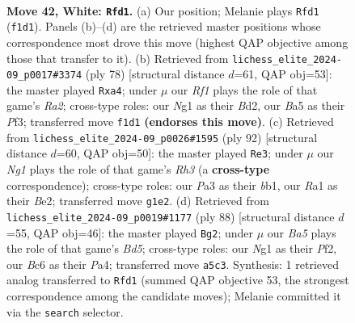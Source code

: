 \documentclass[11pt]{article}
\begin{document}
\clearpage

\begin{figure}[p]\centering
\begin{subfigure}{0.46\textwidth}\centering
\resizebox{\linewidth}{!}{%
\newchessgame
\chessboard[
  setfen={6r1/r7/p1Bnbk2/B5p1/5pP1/PP6/1K5P/R4RN1 w - - 1 42},
  showmover=false,
  pgfstyle=straightmove, color=movearrow, markmove={f1-d1}
]}
\caption{}
\end{subfigure}\hfill
\begin{subfigure}{0.46\textwidth}\centering
\resizebox{\linewidth}{!}{%
\newchessgame
\chessboard[
  setfen={r1r5/4kp2/2P3p1/4p1P1/p1P5/5PK1/R2B4/R7 w - - 1 40},
  showmover=false,
  pgfstyle=straightmove, color=movearrow, markmove={a2-a4}
]}
\caption{}
\end{subfigure}
\\[4pt]
\begin{subfigure}{0.46\textwidth}\centering
\resizebox{\linewidth}{!}{%
\newchessgame
\chessboard[
  setfen={1r4r1/8/2pkp2R/p2p4/3P2P1/PP5R/3KB3/1b6 w - - 9 47},
  showmover=false,
  pgfstyle=straightmove, color=movearrow, markmove={h3-e3}
]}
\caption{}
\end{subfigure}\hfill
\begin{subfigure}{0.46\textwidth}\centering
\resizebox{\linewidth}{!}{%
\newchessgame
\chessboard[
  setfen={2r5/2p1r3/1p1n1k2/1P1B2p1/P2P4/6P1/2R2P2/2R3K1 w - - 1 45},
  showmover=false,
  pgfstyle=straightmove, color=movearrow, markmove={d5-g2}
]}
\caption{}
\end{subfigure}
\caption{\textbf{Move 42, White: \texttt{Rfd1}.} (a) Our position; Melanie plays \texttt{Rfd1} (\texttt{f1d1}). Panels (b)--(d) are the retrieved master positions whose correspondence most drove this move (highest QAP objective among those that transfer to it). (b) Retrieved from \texttt{lichess\_elite\_2024-09\_p0017\#3374} (ply 78) [structural distance $d$=61, QAP obj=53]: the master played \texttt{Rxa4}; under $\mu$ our \emph{Rf1} plays the role of that game's \emph{Ra2}; cross-type roles: our \emph{N}g1 as their \emph{B}d2, our \emph{B}a5 as their \emph{P}f3; transferred move \texttt{f1d1} \textbf{(endorses this move)}. (c) Retrieved from \texttt{lichess\_elite\_2024-09\_p0026\#1595} (ply 92) [structural distance $d$=60, QAP obj=50]: the master played \texttt{Re3}; under $\mu$ our \emph{Ng1} plays the role of that game's \emph{Rh3} (a \textbf{cross-type} correspondence); cross-type roles: our \emph{P}a3 as their \emph{b}b1, our \emph{R}a1 as their \emph{B}e2; transferred move \texttt{g1e2}. (d) Retrieved from \texttt{lichess\_elite\_2024-09\_p0019\#1177} (ply 88) [structural distance $d$=55, QAP obj=46]: the master played \texttt{Bg2}; under $\mu$ our \emph{Ba5} plays the role of that game's \emph{Bd5}; cross-type roles: our \emph{N}g1 as their \emph{P}f2, our \emph{B}c6 as their \emph{P}a4; transferred move \texttt{a5c3}. Synthesis: 1 retrieved analog transferred to \texttt{Rfd1} (summed QAP objective 53, the strongest correspondence among the candidate moves); Melanie committed it via the \texttt{search} selector.}
\label{fig:thought-m82}
\end{figure}
\end{document}
